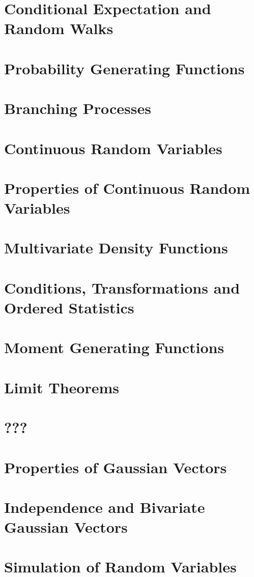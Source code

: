 \documentclass{article}
\begin{document}
\section{Conditional Expectation and Random Walks}

\section{Probability Generating Functions}

\section{Branching Processes}

\section{Continuous Random Variables}

\section{Properties of Continuous Random Variables}

\section{Multivariate Density Functions}

\section{Conditions, Transformations and Ordered Statistics}

\section{Moment Generating Functions}

\section{Limit Theorems}

\section{???}

\section{Properties of Gaussian Vectors}

\section{Independence and Bivariate Gaussian Vectors}

\section{Simulation of Random Variables}

\end{document}
